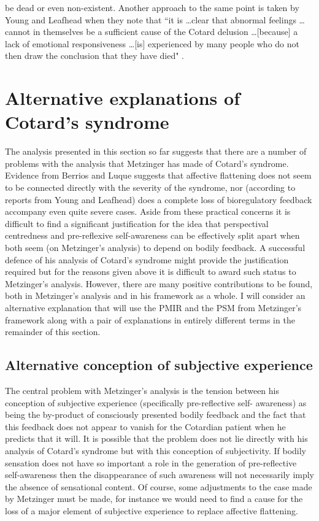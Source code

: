 be dead or even non-existent. Another approach to the same point is taken by Young and Leafhead when they note that ``it is \ldots clear that abnormal feelings \ldots cannot in themselves be a sufficient cause of the Cotard delusion \ldots [because] a lack of emotional responsiveness \ldots [is] experienced by many people who do not then draw the conclusion that they have died" \cite[pp. 164-165]{young1995}.

\section{Alternative explanations of Cotard's syndrome}
\label{psych_lit_alternatives}

The analysis presented in this section so far suggests that there are a number of problems with the analysis that Metzinger has made of Cotard's syndrome. Evidence from Berrios and Luque suggests that affective flattening does not seem to be connected directly with the severity of the syndrome, nor (according to reports from Young and Leafhead) does a complete loss of bioregulatory feedback accompany even quite severe cases. Aside from these practical concerns it is difficult to find a significant justification for the idea that perspectival centredness and pre-reflexive self-awareness can be effectively split apart when both seem (on Metzinger's analysis) to depend on bodily feedback. A successful defence of his analysis of Cotard's syndrome might provide the justification required but for the reasons given above it is difficult to award such status to Metzinger's analysis. However, there are many positive contributions to be found, both in Metzinger's analysis and in his framework as a whole. I will consider an alternative explanation that will use the PMIR and the PSM from Metzinger's framework along with a pair of explanations in entirely different terms in the remainder of this section.

\subsection{Alternative conception of subjective experience}

The central problem with Metzinger's analysis is the tension between his conception of subjective experience (specifically pre-reflective self- awareness) as being the by-product of consciously presented bodily feedback and the fact that this feedback does not appear to vanish for the Cotardian patient when he predicts that it will. It is possible that the problem does not lie directly with his analysis of Cotard's syndrome but with this conception of subjectivity. If bodily sensation does not have so important a role in the generation of pre-reflective self-awareness then the disappearance of such awareness will not necessarily imply the absence of sensational content. Of course, some adjustments to the case made by Metzinger must be made, for instance we would need to find a cause for the loss of a major element of subjective experience to replace affective flattening.

